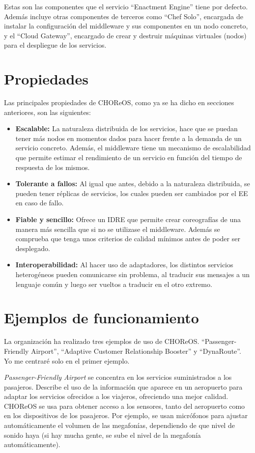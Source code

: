 \documentclass[runningheads]{llncs}
\begin{document}
Estas son las componentes que el servicio ``Enactment Engine'' tiene por defecto. Además incluye otras componentes de terceros como ``Chef Solo'', encargada de instalar la configuración del middleware y sus componentes en un nodo concreto, y el ``Cloud Gateway'', encargado de crear y destruir máquinas virtuales (nodos)~\cite{a_128} para el despliegue de los servicios.

\section{Propiedades}
Las principales propiedades de CHOReOS, como ya se ha dicho en secciones anteriores, son las siguientes:

\begin{itemize}
    \item \textbf{Escalable: }La naturaleza distribuida de los servicios, hace que se puedan tener más nodos en momentos dados para hacer frente a la demanda de un servicio concreto. Además, el middleware tiene un mecanismo de escalabilidad que permite estimar el rendimiento de un servicio en función del tiempo de respuesta de los mismos.
    \item \textbf{Tolerante a fallos: }Al igual que antes, debido a la naturaleza distribuida, se pueden tener réplicas de servicios, los cuales pueden ser cambiados por el EE en caso de fallo.
    \item \textbf{Fiable y sencillo: }Ofrece un IDRE que permite crear coreografías de una manera más sencilla que si no se utilizase el middleware. Además se comprueba que tenga unos criterios de calidad mínimos antes de poder ser desplegado.
    \item \textbf{Interoperabilidad: }Al hacer uso de adaptadores, los distintos servicios heterogéneos pueden comunicarse sin problema, al traducir sus mensajes a un lenguaje común y luego ser vueltos a traducir en el otro extremo.~\cite{a_2}
\end{itemize}
\section{Ejemplos de funcionamiento}
La organización ha realizado tres ejemplos de uso de CHOReOS. ``Passenger-Friendly Airport'', ``Adaptive Customer Relationship Booster'' y ``DynaRoute''.~\cite{a_2} Yo me centraré solo en el primer ejemplo.

\smallskip

\textit{Passenger-Friendly Airport} se concentra en los servicios suministrados a los pasajeros. Describe el uso de la información que aparece en un aeropuerto para adaptar los servicios ofrecidos a los viajeros, ofreciendo una mejor calidad. CHOReOS se usa para obtener acceso a los sensores, tanto del aeropuerto como en los dispositivos de los pasajeros. Por ejemplo, se usan micrófonos para ajustar automáticamente el volumen de las megafonías, dependiendo de que nivel de sonido haya (si hay mucha gente, se sube el nivel de la megafonía automáticamente).~\cite{a_128}
\end{document}
